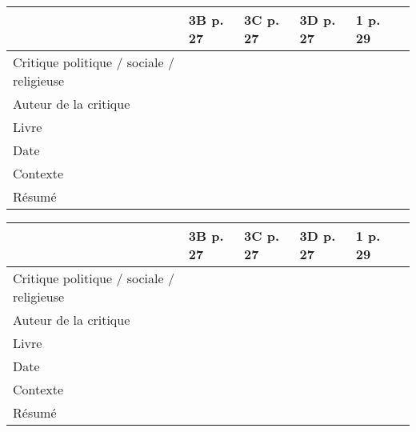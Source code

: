\documentclass[12pt,a4paper,landscape]{article}
\begin{document}
\begin{tabular}{|p{5cm}|p{5cm}|p{5cm}|p{5cm}|p{5cm}|p{5cm}|}
\hline & 3B p. 27  & 3C p. 27 & 3D p. 27 & 1 p. 29  \\ 
\hline Critique politique / sociale / religieuse &  &  &  &   \\ 
\hline Auteur de la critique &  &  &  &   \\ 
\hline Livre &  &  &  &   \\ 
\hline Date &  &  &  &  \\ 
\hline Contexte & \vspace{1.5cm}  &  &  &  \\ 
\hline Résumé & \vspace{4cm}  &  &  &  \\ 
\hline 
\end{tabular}  

\vfill

\begin{tabular}{|p{5cm}|p{5cm}|p{5cm}|p{5cm}|p{5cm}|p{5cm}|}
\hline & 3B p. 27  & 3C p. 27 & 3D p. 27 & 1 p. 29  \\ 
\hline Critique politique / sociale / religieuse &  &  &  &   \\ 
\hline Auteur de la critique &  &  &  &   \\ 
\hline Livre &  &  &  &   \\ 
\hline Date &  &  &  &  \\ 
\hline Contexte & \vspace{1.5cm}  &  &  &  \\ 
\hline Résumé & \vspace{4cm}  &  &  &  \\ 
\hline 
\end{tabular}  
\end{document}
